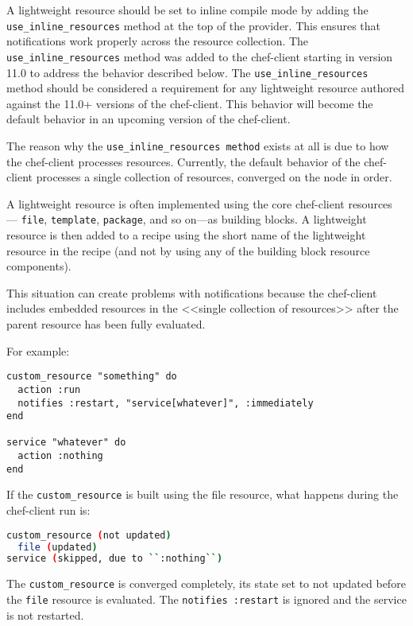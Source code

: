 A lightweight resource should be set to inline compile mode by adding the \lstinline!use_inline_resources! method at the top of the provider. This ensures that notifications work properly across the resource collection. The \lstinline!use_inline_resources! method was added to the chef-client starting in version 11.0 to address the behavior described below. The \lstinline!use_inline_resources! method should be considered a requirement for any lightweight resource authored against the 11.0+ versions of the chef-client. This behavior will become the default behavior in an upcoming version of the chef-client.

The reason why the \lstinline!use_inline_resources method! exists at all is due to how the chef-client processes resources. Currently, the default behavior of the chef-client processes a single collection of resources, converged on the node in order.

A lightweight resource is often implemented using the core chef-client resources — \lstinline!file!, \lstinline!template!, \lstinline!package!, and so on—as building blocks. A lightweight resource is then added to a recipe using the short name of the lightweight resource in the recipe (and not by using any of the building block resource components).

This situation can create problems with notifications because the chef-client includes embedded resources in the <<single collection of resources>> after the parent resource has been fully evaluated.

For example:

\begin{lstlisting}[label=lst:cookbook-lwrp-inline-resources1]
custom_resource "something" do
  action :run
  notifies :restart, "service[whatever]", :immediately
end

service "whatever" do
  action :nothing
end
\end{lstlisting}

If the \lstinline!custom_resource! is built using the file resource, what happens during the chef-client run is:

\begin{lstlisting}[language=Bash,label=lst:cookbook-lwrp-inline-resources2]
custom_resource (not updated)
  file (updated)
service (skipped, due to ``:nothing``)
\end{lstlisting}

The \lstinline!custom_resource! is converged completely, its state set to not updated before the \lstinline!file! resource is evaluated. The \lstinline!notifies :restart! is ignored and the service is not restarted.

